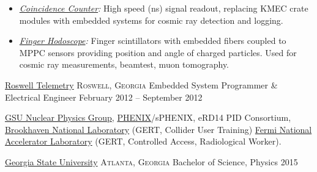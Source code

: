 \documentclass[10pt,letterpaper]{article}
\begin{document}
{{\begin{itemize}
      \item \emph{\href{https://github.com/Sawaiz/coincidenceCounter}{Coincidence Counter}:}
        High speed (ns) signal readout, replacing KMEC crate modules with embedded systems for cosmic ray detection and logging.
      \item \emph{\href{https://github.com/Sawaiz/modularHodoscope}{Finger Hodoscope}:}
        Finger scintillators with embedded fibers coupled to MPPC sensors providing position and angle of charged particles. Used for cosmic ray measurements, beamtest, muon tomography.
    \end{itemize}
    }
}

\headedsection
  {\href{http://web.archive.org/web/20111024221117/http://www.roswelltelemetry.com/}{Roswell Telemetry}}
  {\textsc{Roswell, Georgia}} {%
  \headedsubsection
    {Embedded System Programmer \& Electrical Engineer}
    {February 2012 -- September 2012}
    {}
}

\spacedhrule{0.2em}{-0.4em}

  {\href{http://phynp6.phy-astr.gsu.edu/}{GSU Nuclear Physics Group},
  \href{https://www.phenix.bnl.gov/}{PHENIX}/sPHENIX,
  eRD14 PID Consortium,
  \href{https://www.bnl.gov/}{Brookhaven National Laboratory} (GERT, Collider User Training)
  \href{http://www.fnal.gov/}{Fermi National Accelerator Laboratory} (GERT, Controlled Access, Radiological Worker).
  }

  \spacedhrule{0.2em}{-0.4em}

\headedsection
  {\href{http://www.gsu.edu}{Georgia State University}}
  {\textsc{Atlanta, Georgia}} {%
  \headedsubsection
    {Bachelor of Science, Physics}
    {2015}
    {}
}

\spacedhrule{0.5em}{-0.4em}

\end{document}
